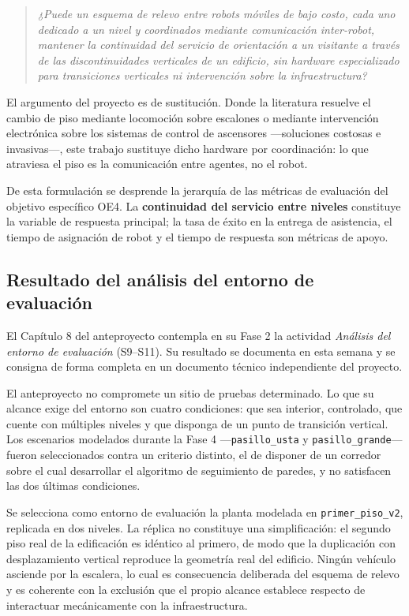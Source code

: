 \documentclass[12pt,letterpaper]{article}
\begin{document}
\begin{quote}
\textit{¿Puede un esquema de relevo entre robots móviles de bajo costo, cada uno dedicado a un nivel y coordinados mediante comunicación inter-robot, mantener la continuidad del servicio de orientación a un visitante a través de las discontinuidades verticales de un edificio, sin hardware especializado para transiciones verticales ni intervención sobre la infraestructura?}
\end{quote}

El argumento del proyecto es de sustitución. Donde la literatura resuelve el cambio de piso mediante locomoción sobre escalones o mediante intervención electrónica sobre los sistemas de control de ascensores ---soluciones costosas e invasivas---, este trabajo sustituye dicho hardware por coordinación: lo que atraviesa el piso es la comunicación entre agentes, no el robot.

De esta formulación se desprende la jerarquía de las métricas de evaluación del objetivo específico OE4. La \textbf{continuidad del servicio entre niveles} constituye la variable de respuesta principal; la tasa de éxito en la entrega de asistencia, el tiempo de asignación de robot y el tiempo de respuesta son métricas de apoyo.

\subsection{Resultado del análisis del entorno de evaluación}

El Capítulo 8 del anteproyecto contempla en su Fase 2 la actividad \textit{Análisis del entorno de evaluación} (S9--S11). Su resultado se documenta en esta semana y se consigna de forma completa en un documento técnico independiente del proyecto.

El anteproyecto no compromete un sitio de pruebas determinado. Lo que su alcance exige del entorno son cuatro condiciones: que sea interior, controlado, que cuente con múltiples niveles y que disponga de un punto de transición vertical. Los escenarios modelados durante la Fase 4 ---\texttt{pasillo\_usta} y \texttt{pasillo\_grande}--- fueron seleccionados contra un criterio distinto, el de disponer de un corredor sobre el cual desarrollar el algoritmo de seguimiento de paredes, y no satisfacen las dos últimas condiciones.

Se selecciona como entorno de evaluación la planta modelada en \texttt{primer\_piso\_v2}, replicada en dos niveles. La réplica no constituye una simplificación: el segundo piso real de la edificación es idéntico al primero, de modo que la duplicación con desplazamiento vertical reproduce la geometría real del edificio. Ningún vehículo asciende por la escalera, lo cual es consecuencia deliberada del esquema de relevo y es coherente con la exclusión que el propio alcance establece respecto de interactuar mecánicamente con la infraestructura.
\end{document}
